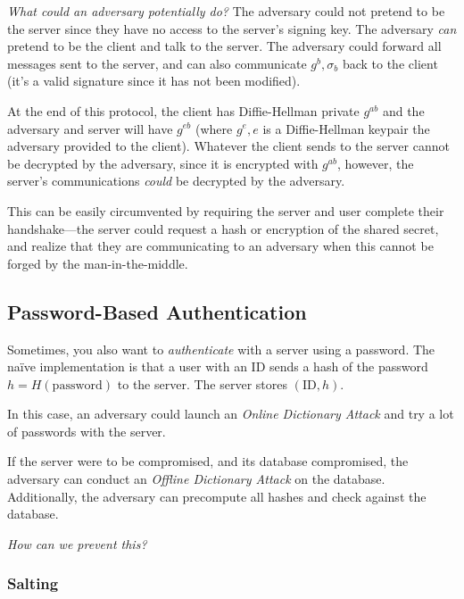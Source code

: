 
\emph{What could an adversary potentially do?} The adversary could not pretend to be the server since they have no access to the server's signing key. The adversary \emph{can} pretend to be the client and talk to the server. The adversary could forward all messages sent to the server, and can also communicate $g^b, \sigma_b$ back to the client (it's a valid signature since it has not been modified).

At the end of this protocol, the client has Diffie-Hellman private $g^{ab}$ and the adversary and server will have $g^{eb}$ (where $g^e, e$ is a Diffie-Hellman keypair the adversary provided to the client). Whatever the client sends to the server cannot be decrypted by the adversary, since it is encrypted with $g^{ab}$, however, the server's communications \emph{could} be decrypted by the adversary.

This can be easily circumvented by requiring the server and user complete their handshake---the server could request a hash or encryption of the shared secret, and realize that they are communicating to an adversary when this cannot be forged by the man-in-the-middle.


\subsection{Password-Based Authentication}
Sometimes, you also want to \emph{authenticate} with a server using a password. The na\"ive implementation is that a user with an ID sends a hash of the password $h = H(\mathrm{password})$ to the server. The server stores $(\mathrm{ID}, h)$.


In this case, an adversary could launch an \emph{Online Dictionary Attack} and try a lot of passwords with the server.

If the server were to be compromised, and its database compromised, the adversary can conduct an \emph{Offline Dictionary Attack} on the database. Additionally, the adversary can precompute all hashes and check against the database.

\emph{How can we prevent this? }

\subsubsection{Salting}

